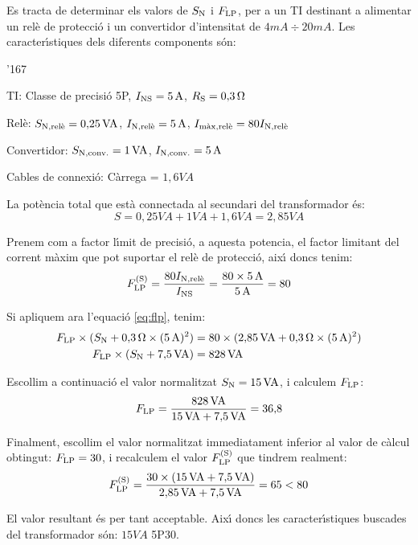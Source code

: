 \begin{exemple}

Es tracta de determinar els valors de $S_\mathrm{N}$ i $F_\mathrm{LP}$,  per
a un TI destinant a alimentar  un rel\`{e} de protecci\'{o} i un convertidor
d'intensitat de $4\unit{mA}\div20\unit{mA}$. Les caracter\'{\i}stiques
dels diferents components s\'{o}n:
\begin{dinglist}{'167}
    \item TI: Classe de precisi\'{o}  5P, $I_\mathrm{NS}=5\mathrm{\,A}$,
    $R_\mathrm{S}=0{,}3\mathrm{\,\mathrm{\Omega}}$
    \item Rel\`{e}: $S_\mathrm{N,rel\grave{e}}=0{,}25\mathrm{\,VA}$,
    $I_\mathrm{N,rel\grave{e}}=5\mathrm{\,A}$, $I_\mathrm{m\grave{a}x,rel\grave{e}}=
    80 I_\mathrm{N,rel\grave{e}}$
    \item Convertidor: $S_\mathrm{N,conv.}=1\mathrm{\,VA}$,
    $I_\mathrm{N,conv.}=5\mathrm{\,A}$
    \item Cables de connexi\'{o}: C\`{a}rrega = $1{,}6\unit{VA}$
\end{dinglist}

La pot\`{e}ncia total que est\`{a} connectada al secundari del transformador
\'{e}s:
\[
    S = 0{,}25\unit{VA} + 1\unit{VA} + 1{,}6\unit{VA} = 2{,}85\unit{VA}
\]

Prenem com a factor l\'{\i}mit de precisi\'{o},  a aquesta potencia, el
factor limitant del corrent m\`{a}xim que pot suportar el rel\`{e} de
protecci\'{o}, aix\'{\i} doncs tenim:
\[
    F_\mathrm{LP}^\mathrm{(S)} = \frac{80 I_\mathrm{N,rel\grave{e}}}{I_\mathrm{NS}} =
    \frac{80\times 5\mathrm{\,A}}{5\mathrm{\,A}} = 80
\]

Si apliquem ara l'equaci\'{o} \eqref{eq:flp}, tenim:
\begin{align*}
    F_\mathrm{LP}\times(S_\mathrm{N}+0{,}3\mathrm{\,\mathrm{\Omega}} \times (5\mathrm{\,A})^2) &=
    80\times(2{,}85\mathrm{\,VA}+0{,}3\mathrm{\,\mathrm{\Omega}} \times (5\mathrm{\,A})^2) \\
    F_\mathrm{LP}\times(S_\mathrm{N}+7{,}5\mathrm{\,VA}) &= 828\mathrm{\,VA}
\end{align*}

Escollim a continuaci\'{o} el valor normalitzat $S_\mathrm{N}=
15\mathrm{\,VA}$, i calculem $F_\mathrm{LP}$:
\[
    F_\mathrm{LP} = \frac{828\mathrm{\,VA}}{15\mathrm{\,VA}+7{,}5\mathrm{\,VA}}
    = 36{,}8
\]

Finalment, escollim el valor normalitzat immediatament inferior al valor
de c\`{a}lcul obtingut: $F_\mathrm{LP} = 30$, i
recalculem el valor $F_\mathrm{LP}^\mathrm{(S)}$ que tindrem realment:
\[
    F_\mathrm{LP}^\mathrm{(S)} = \frac{30\times(15\mathrm{\,VA} + 7{,}5\mathrm{\,VA})}
    {2{,}85\mathrm{\,VA} + 7{,}5\mathrm{\,VA}} = 65 < 80
    \]

    El valor resultant \'{e}s per tant acceptable. Aix\'{\i} doncs les
    caracter\'{\i}stiques buscades del transformador s\'{o}n: $15\unit{VA}$ 5P30.

\end{exemple}

